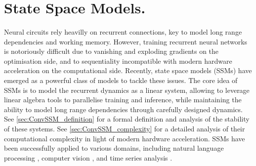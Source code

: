\documentclass{article}
\begin{document}
\section{State Space Models.}
\label{sec:SSM}

\paragraph{} 
Neural circuits rely heavilly on recurrent connections, key to model long range dependencies and working memory. However, training recurrent neural networks is notoriously difficult due to vanishing and exploding gradients on the optimisation side, and to sequentiality incompatible with modern hardware acceleration on the computational side. Recently, state space models (SSMs) have emerged as a powerful class of models to tackle these issues. The core idea of SSMs is to model the recurrent dynamics as a linear system, allowing to leverage linear algebra tools to parallelise training and inference, while maintaining the ability to model long range dependencies through carefully designed dynamics. See \cref{sec:ConvSSM_definition} for a formal definition and analysis of the stability of these systems. See \cref{sec:ConvSSM_complexity} for a detailed analysis of their computational complexity in light of modern hardware acceleration.
%
SSMs have been successfully applied to various domains, including natural language processing \citep{TODO}, computer vision \citep{TODO}, and time series analysis \citep{TODO}.
\end{document}
